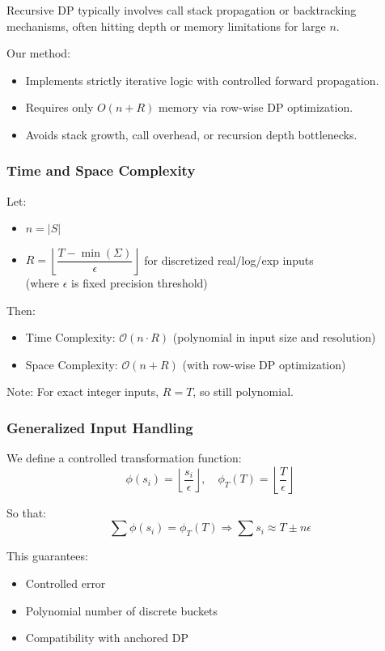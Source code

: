 \documentclass[11pt]{article}
\begin{document}
Recursive DP typically involves call stack propagation or backtracking mechanisms, often hitting depth or memory limitations for large $n$.

Our method:
\begin{itemize}
  \item Implements strictly iterative logic with controlled forward propagation.
  \item Requires only $O(n + R)$ memory via row-wise DP optimization.
  \item Avoids stack growth, call overhead, or recursion depth bottlenecks.
\end{itemize}

\vspace{1em}

\subsubsection{Time and Space Complexity}

Let:
\begin{itemize}
    \item $n = |S|$
    \item $R = \left\lfloor \dfrac{T - \min(\Sigma)}{\epsilon} \right\rfloor$ for discretized real/log/exp inputs \\
    (where $\epsilon$ is fixed precision threshold)
\end{itemize}

Then:
\begin{itemize}
    \item Time Complexity: $\mathcal{O}(n \cdot R)$ (polynomial in input size and resolution)
    \item Space Complexity: $\mathcal{O}(n + R)$ (with row-wise DP optimization)
\end{itemize}

Note: For exact integer inputs, $R = T$, so still polynomial.

\subsubsection{Generalized Input Handling}

We define a controlled transformation function:
\[
\phi(s_i) = \left\lfloor \frac{s_i}{\epsilon} \right\rfloor,\quad \phi_T(T) = \left\lfloor \frac{T}{\epsilon} \right\rfloor
\]

So that:
\[
\sum \phi(s_i) = \phi_T(T) \Rightarrow \sum s_i \approx T \pm n\epsilon
\]

This guarantees:
\begin{itemize}
    \item Controlled error
    \item Polynomial number of discrete buckets
    \item Compatibility with anchored DP
\end{itemize}
\end{document}
